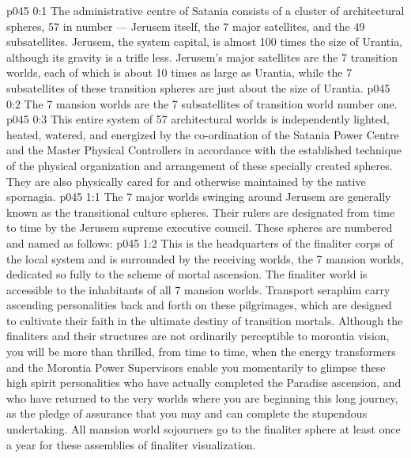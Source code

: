 \author{Melchizedek}
\vs p045 0:1 The administrative centre of Satania consists of a cluster of architectural spheres, 57 in number --- Jerusem itself, the 7 major satellites, and the 49 subsatellites. Jerusem, the system capital, is almost 100 times the size of Urantia, although its gravity is a trifle less. Jerusem’s major satellites are the 7 transition worlds, each of which is about 10 times as large as Urantia, while the 7 subsatellites of these transition spheres are just about the size of Urantia.
\vs p045 0:2 The 7 mansion worlds are the 7 subsatellites of transition world number one.
\vs p045 0:3 This entire system of 57 architectural worlds is independently lighted, heated, watered, and energized by the co\hyp{}ordination of the Satania Power Centre and the Master Physical Controllers in accordance with the established technique of the physical organization and arrangement of these specially created spheres. They are also physically cared for and otherwise maintained by the native spornagia.
\vs p045 1:1 The 7 major worlds swinging around Jerusem are generally known as the transitional culture spheres. Their rulers are designated from time to time by the Jerusem supreme executive council. These spheres are numbered and named as follows:
\vs p045 1:2 \pc {} This is the headquarters of the finaliter corps of the local system and is surrounded by the receiving worlds, the 7 mansion worlds, dedicated so fully to the scheme of mortal ascension. The finaliter world is accessible to the inhabitants of all 7 mansion worlds. Transport seraphim carry ascending personalities back and forth on these pilgrimages, which are designed to cultivate their faith in the ultimate destiny of transition mortals. Although the finaliters and their structures are not ordinarily perceptible to morontia vision, you will be more than thrilled, from time to time, when the energy transformers and the Morontia Power Supervisors enable you momentarily to glimpse these high spirit personalities who have actually completed the Paradise ascension, and who have returned to the very worlds where you are beginning this long journey, as the pledge of assurance that you may and can complete the stupendous undertaking. All mansion world sojourners go to the finaliter sphere at least once a year for these assemblies of finaliter visualization.
